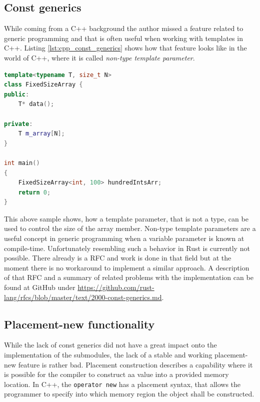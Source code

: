 \subsection{Const generics} \label{rust_const_generics}

While coming from a C++ background the author missed a feature related to generic programming and that is often useful when working with templates in C++. Listing \ref{lst:cpp_const_generics} shows how that feature looks like in the world of C++, where it is called \textit{non-type template parameter}.\\

\begin{lstlisting}[caption={Showcasing template non-type parameters in C++}, label={lst:rust_generic_code}, language=C++]
template<typename T, size_t N>
class FixedSizeArray {
public:
	T* data();
	
private:
	T m_array[N];
}

int main() 
{
	FixedSizeArray<int, 100> hundredIntsArr;
	return 0;
}
\end{lstlisting}

\noindent
This above sample shows, how a template parameter, that is not a type, can be used to control the size of the array member. Non-type template parameters are a useful concept in generic programming when a variable parameter is known at compile-time. Unfortunately resembling such a behavior in Rust is currently not possible. There already is a \ac{RFC} and work is done in that field but at the moment there is no workaround to implement a similar approach. A description of that \ac{RFC} and a summary of related problems with the implementation can be found at GitHub under \url{https://github.com/rust-lang/rfcs/blob/master/text/2000-const-generics.md}.

\subsection{Placement-new functionality}

While the lack of const generics did not have a great impact onto the implementation of the submodules, the lack of a stable and working placement-new feature is rather bad. Placement construction describes a capability where it is possible for the compiler to construct aa value into a provided memory location. In C++, the \texttt{operator new} has a placement syntax, that allows the programmer to specify into which memory region the object shall be constructed.

